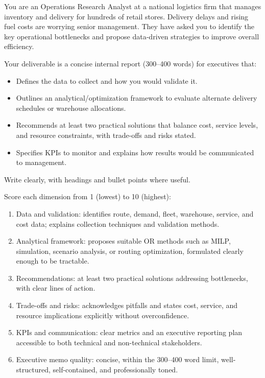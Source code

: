 \begin{tcolorbox}[taskprompt, title=Task Prompt — Operations Research]
You are an Operations Research Analyst at a national logistics firm that manages
inventory and delivery for hundreds of retail stores. Delivery delays and rising
fuel costs are worrying senior management. They have asked you to identify the key
operational bottlenecks and propose data-driven strategies to improve overall
efficiency.

Your deliverable is a concise internal report (300--400 words) for executives that:
\begin{itemize}
  \setlength{\itemsep}{0pt}
  \item Defines the data to collect and how you would validate it.
  \item Outlines an analytical/optimization framework to evaluate alternate
        delivery schedules or warehouse allocations.
  \item Recommends at least two practical solutions that balance cost, service
        levels, and resource constraints, with trade-offs and risks stated.
  \item Specifies KPIs to monitor and explains how results would be communicated
        to management.
\end{itemize}
Write clearly, with headings and bullet points where useful.
\end{tcolorbox}

\begin{tcolorbox}[rubricbox, title=Evaluation Rubric — Operations Research]
Score each dimension from 1 (lowest) to 10 (highest):
\begin{enumerate}
  \setlength{\itemsep}{0pt}
  \item Data and validation: identifies route, demand, fleet, warehouse, service,
        and cost data; explains collection techniques and validation methods.
  \item Analytical framework: proposes suitable OR methods such as MILP,
        simulation, scenario analysis, or routing optimization, formulated clearly
        enough to be tractable.
  \item Recommendations: at least two practical solutions addressing bottlenecks,
        with clear lines of action.
  \item Trade-offs and risks: acknowledges pitfalls and states cost, service, and
        resource implications explicitly without overconfidence.
  \item KPIs and communication: clear metrics and an executive reporting plan
        accessible to both technical and non-technical stakeholders.
  \item Executive memo quality: concise, within the 300--400 word limit,
        well-structured, self-contained, and professionally toned.
\end{enumerate}
\end{tcolorbox}

